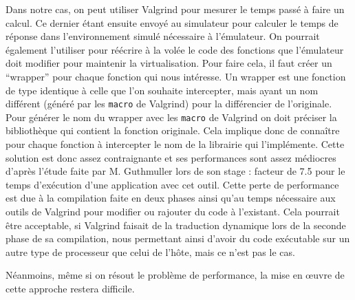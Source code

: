 Dans notre cas, on peut utiliser Valgrind pour mesurer le temps passé à faire un
calcul. Ce dernier étant ensuite envoyé au simulateur pour calculer le temps de
réponse dans l'environnement simulé nécessaire à l'émulateur. On pourrait
également l'utiliser pour réécrire à la volée le code des fonctions que
l'émulateur doit modifier pour maintenir la virtualisation. Pour faire cela, il
faut créer un ``wrapper'' pour chaque fonction qui nous intéresse. Un wrapper
est une fonction de type identique à celle que l'on souhaite intercepter, mais
ayant un nom différent (généré par les \texttt{macro} de Valgrind) pour la
différencier de l'originale. Pour générer le nom du wrapper avec
les \texttt{macro} de Valgrind on doit préciser la bibliothèque qui contient la
fonction originale. Cela implique donc de connaître pour chaque fonction à
intercepter le nom de la librairie qui l'implémente. Cette solution est donc
assez contraignante et ses performances sont assez médiocres d'après l'étude
faite par M. Guthmuller lors de son stage \citep{MARION:Interception}: facteur
de 7.5 pour le temps d'exécution d'une application avec cet outil. Cette perte
de performance est due à la compilation faite en deux phases ainsi qu'au temps
nécessaire aux outils de Valgrind pour modifier ou rajouter du code à
l'existant. Cela pourrait être acceptable, si Valgrind faisait de la traduction
dynamique lors de la seconde phase de sa compilation, nous permettant ainsi
d'avoir du code exécutable sur un autre type de processeur que celui de l'hôte,
mais ce n'est pas le cas.

Néanmoins, même si on résout le problème de performance, la mise en \oe uvre de
cette approche restera difficile.
